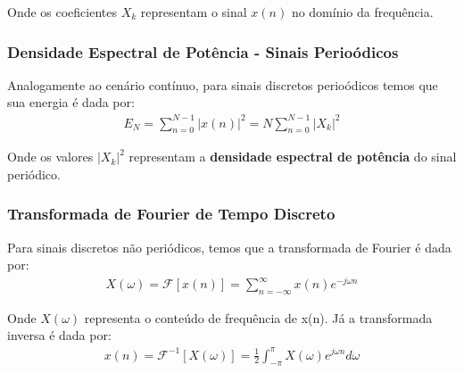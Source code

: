 \documentclass{article}
\begin{document}
Onde os coeficientes $X_k$ representam o sinal $x(n)$ no domínio da frequência.

\subsubsection{Densidade Espectral de Potência - Sinais Perioódicos}
Analogamente ao cenário contínuo, para sinais discretos perioódicos temos que sua energia é dada por:
\begin{align}
    E_N = \sum^{N-1}_{n=0} |x(n)|^2 = N\sum^{N-1}_{n=0} |X_k|^2
\end{align}

Onde os valores $|X_k|^2$ representam a \textbf{densidade espectral de potência} do sinal periódico.

\subsubsection{Transformada de Fourier de Tempo Discreto}
Para sinais discretos não periódicos, temos que a transformada de Fourier é dada por:
\begin{align}
    X(\omega) = \mathcal{F}[x(n)] = \sum^\infty _{n=-\infty} x(n) e^{-j\omega n}
\end{align}

Onde $X(\omega)$ representa o conteúdo de frequência de x(n).  Já a transformada inversa é dada por: 
\begin{align}
    x(n) = \mathcal{F}^{-1}[X(\omega)] = \frac{1}{2}\int^\pi _{-\pi}X(\omega)e^{j\omega n}d\omega
\end{align}
\end{document}
